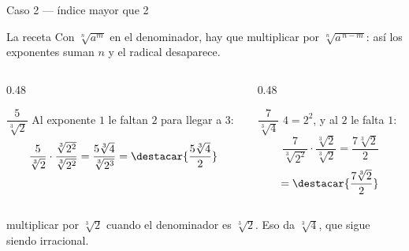 \documentclass[aspectratio=169,10pt]{beamer}
\begin{document}
\begin{frame}{Caso 2 — índice mayor que 2}
  \scriptsize
  \begin{block}{La receta}
    \tiny
    Con $\sqrt[n]{a^{m}}$ en el denominador, hay que multiplicar por
    $\sqrt[n]{a^{\,n-m}}$: así los exponentes suman $n$ y el radical
    desaparece. 
  \end{block}

  \vspace{0.1cm}
  \begin{columns}[T,onlytextwidth]
    \begin{column}{0.48\textwidth}
      \begin{exampleblock}{$\dfrac{5}{\sqrt[3]{2}}$}
        \tiny
        Al exponente $1$ le faltan $2$ para llegar a $3$:
        \[ \frac{5}{\sqrt[3]{2}}\cdot
           \frac{\sqrt[3]{2^{2}}}{\sqrt[3]{2^{2}}}
           = \frac{5\sqrt[3]{4}}{\sqrt[3]{2^{3}}}
           = \destacar{\frac{5\sqrt[3]{4}}{2}} \]
      \end{exampleblock}
    \end{column}
    \begin{column}{0.48\textwidth}
      \begin{exampleblock}{$\dfrac{7}{\sqrt[3]{4}}$}
        \tiny
        $4 = 2^{2}$, y al $2$ le falta $1$:
        \[ \frac{7}{\sqrt[3]{2^{2}}}\cdot
           \frac{\sqrt[3]{2}}{\sqrt[3]{2}}
           = \frac{7\sqrt[3]{2}}{2} \]
        \[ = \destacar{\frac{7\sqrt[3]{2}}{2}} \]
      \end{exampleblock}
    \end{column}
  \end{columns}

  \vspace{0.08cm}
  {\tiny\color{uniGris}  multiplicar por
  $\sqrt[3]{2}$ cuando el denominador es $\sqrt[3]{2}$. Eso da
  $\sqrt[3]{4}$, que sigue siendo irracional. }
\end{frame}
\end{document}
